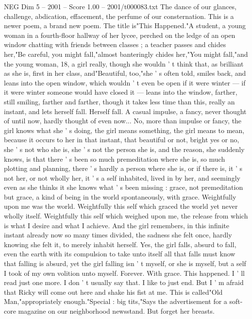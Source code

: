 \begin{textsample}{NEG Dim 5 – 2001 – Score 1.00 – 2001/t000083.txt}
The dance of our glances, challenge, abdication, effacement, the perfume of our consternation.
This is a newer poem, a brand new poem.
The title is"This Happened."A student, a young woman in a fourth-floor hallway of her lycee, perched on the ledge of an open window chatting with friends between classes ; a teacher passes and chides her,"Be careful, you might fall,"almost banteringly chides her,"You might fall,"and the young woman, 18, a girl really, though she wouldn ' t think that, as brilliant as she is, first in her class, and"Beautiful, too,"she ' s often told, smiles back, and leans into the open window, which wouldn ' t even be open if it were winter — if it were winter someone would have closed it — leans into the window, farther, still smiling, farther and farther, though it takes less time than this, really an instant, and lets herself fall.
Herself fall.
A casual impulse, a fancy, never thought of until now, hardly thought of even now...
No, more than impulse or fancy, the girl knows what she ' s doing, the girl means something, the girl means to mean, because it occurs to her in that instant, that beautiful or not, bright yes or no, she ' s not who she is, she ' s not the person she is, and the reason, she suddenly knows, is that there ' s been so much premeditation where she is, so much plotting and planning, there ' s hardly a person where she is, or if there is, it ' s not her, or not wholly her, it ' s a self inhabited, lived in by her, and seemingly even as she thinks it she knows what ' s been missing : grace, not premeditation but grace, a kind of being in the world spontaneously, with grace.
Weightfully upon me was the world.
Weightfully this self which graced the world yet never wholly itself.
Weightfully this self which weighed upon me, the release from which is what I desire and what I achieve.
And the girl remembers, in this infinite instant already now so many times divided, the sadness she felt once, hardly knowing she felt it, to merely inhabit herself.
Yes, the girl falls, absurd to fall, even the earth with its compulsion to take unto itself all that falls must know that falling is absurd, yet the girl falling isn ' t myself, or she is myself, but a self I took of my own volition unto myself.
Forever.
With grace.
This happened.
I ' ll read just one more.
I don ' t usually say that.
I like to just end.
But I ' m afraid that Ricky will come out here and shake his fist at me.
This is called"Old Man,"appropriately enough."Special : big tits,"Says the advertisement for a soft-core magazine on our neighborhood newsstand.
But forget her breasts.

\end{textsample}
